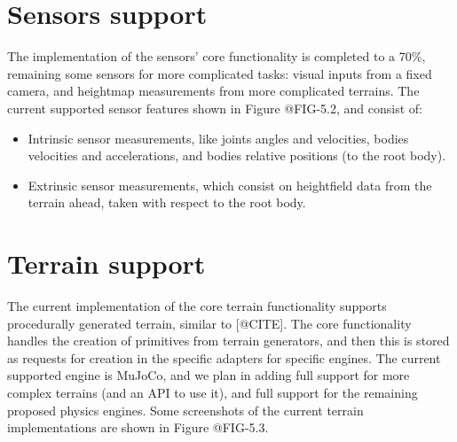 \figProgressAgents

\section{Sensors support}

The implementation of the sensors' core functionality is completed to a 70\%,
remaining some sensors for more complicated tasks: visual inputs from a fixed camera,
and heightmap measurements from more complicated terrains. The current supported sensor
features shown in Figure @FIG-5.2, and consist of:

\begin{itemize}
    \item Intrinsic sensor measurements, like joints angles and velocities, bodies velocities
          and accelerations, and bodies relative positions (to the root body).
    \item Extrinsic sensor measurements, which consist on heightfield data from the terrain ahead,
          taken with respect to the root body.
\end{itemize}

\figProgressSensors

\section{Terrain support}

The current implementation of the core terrain functionality supports procedurally generated
terrain, similar to [@CITE]. The core functionality handles the creation of primitives from
terrain generators, and then this is stored as requests for creation in the specific
adapters for specific engines. The current supported engine is MuJoCo, and we plan in adding
full support for more complex terrains (and an API to use it), and full support for the remaining
proposed physics engines. Some screenshots of the current terrain implementations are shown
in Figure @FIG-5.3.

\figProgressTerrains

